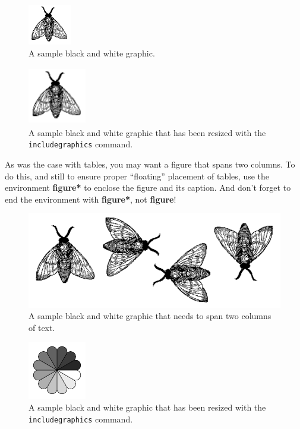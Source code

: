 \begin{figure}
\includegraphics{fly}
\caption{A sample black and white graphic.}
\end{figure}

\begin{figure}
\includegraphics[height=1in, width=1in]{fly}
\caption{A sample black and white graphic
that has been resized with the \texttt{includegraphics} command.}
\end{figure}


As was the case with tables, you may want a figure that spans two
columns.  To do this, and still to ensure proper ``floating''
placement of tables, use the environment \textbf{figure*} to enclose
the figure and its caption.  And don't forget to end the environment
with \textbf{figure*}, not \textbf{figure}!

\begin{figure}
\includegraphics{flies}
\caption{A sample black and white graphic
that needs to span two columns of text.}
\end{figure}


\begin{figure}
\includegraphics[height=1in, width=1in]{rosette}
\caption{A sample black and white graphic that has
been resized with the \texttt{includegraphics} command.}
\end{figure}

